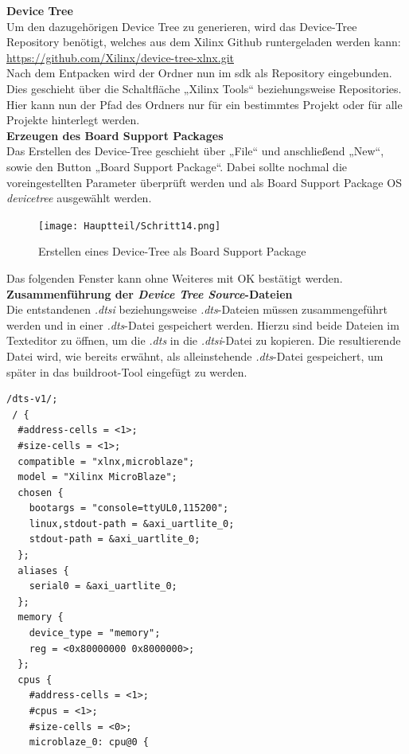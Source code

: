 \textbf{Device Tree}\\

Um den dazugehörigen Device Tree zu generieren, wird das Device-Tree
 Repository benötigt, welches aus dem Xilinx Github runtergeladen werden kann: \url{https://github.com/Xilinx/device-tree-xlnx.git}\\
Nach dem Entpacken wird der Ordner nun im \ac{sdk} als Repository eingebunden.
 Dies geschieht über die Schaltfläche „Xilinx Tools“ beziehungsweise Repositories.
  Hier kann nun der Pfad des Ordners nur für ein bestimmtes Projekt oder für alle Projekte hinterlegt werden.\\

\textbf{Erzeugen des Board Support Packages}\\

Das Erstellen des Device-Tree geschieht über „File“ und anschließend „New“, sowie den Button „Board Support Package“.
Dabei sollte nochmal die voreingestellten Parameter überprüft werden und als Board Support Package OS
\emph{devicetree} ausgewählt werden.

\begin{figure}[H]
\centering
\texttt{[image: Hauptteil/Schritt14.png]}
\caption{Erstellen eines Device-Tree als Board Support Package}\label{fig:mbschritt14}
\end{figure}

Das folgenden Fenster kann ohne Weiteres mit OK bestätigt werden.\\


\textbf{Zusammenführung der \emph{Device Tree Source}-Dateien}\\

Die entstandenen \emph{.dtsi} beziehungsweise \emph{.dts}-Dateien müssen zusammengeführt werden und in einer \emph{.dts}-Datei gespeichert werden.
Hierzu sind beide Dateien im Texteditor zu öffnen, um die \emph{.dts}
 in die \emph{.dtsi}-Datei zu kopieren.
 Die resultierende Datei wird, wie bereits erwähnt, als alleinstehende \emph{.dts}-Datei gespeichert, um später in das buildroot-Tool eingefügt zu werden.\\

 \begin{lstlisting}[caption={Artix7.dts-Datei},label={code:artixdts}]
 /dts-v1/;
 / {
  #address-cells = <1>;
  #size-cells = <1>;
  compatible = "xlnx,microblaze";
  model = "Xilinx MicroBlaze";
  chosen {
    bootargs = "console=ttyUL0,115200";
    linux,stdout-path = &axi_uartlite_0;
    stdout-path = &axi_uartlite_0;
  };
  aliases {
    serial0 = &axi_uartlite_0;
  };
  memory {
    device_type = "memory";
    reg = <0x80000000 0x8000000>;
  };
  cpus {
    #address-cells = <1>;
    #cpus = <1>;
    #size-cells = <0>;
    microblaze_0: cpu@0 {
  \end{lstlisting}


